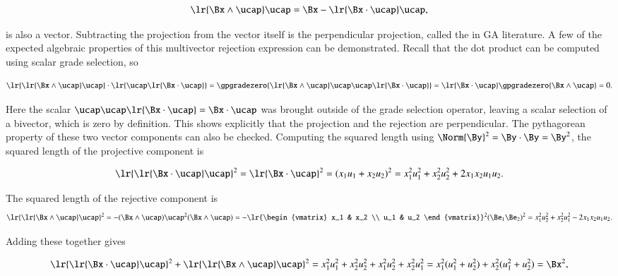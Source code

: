 \begin{dmath}\label{eqn:SimpleProducts2:700}
\lr{ \Bx \wedge \ucap } \ucap
=\Bx - \lr{ \Bx \cdot \ucap } \ucap,
\end{dmath}

is also a vector.
Subtracting the projection from the vector itself is the perpendicular projection, called the  in GA literature.
A few of the expected algebraic properties of this multivector rejection expression can be demonstrated.
Recall that the dot product can be computed using scalar grade selection, so

\begin{dmath}\label{eqn:SimpleProducts2:720}
\lr{ \lr{ \Bx \wedge \ucap } \ucap } \cdot \lr{ \ucap \lr{ \Bx \cdot \ucap } }
=
\gpgradezero{ \lr{ \Bx \wedge \ucap } \ucap \ucap \lr{ \Bx \cdot \ucap } }
=
\lr{ \Bx \cdot \ucap }
\gpgradezero{ \Bx \wedge \ucap }
= 0.
\end{dmath}

Here the scalar \( \ucap \ucap \lr{ \Bx \cdot \ucap } = \Bx \cdot \ucap \) was brought outside of the grade selection operator, leaving a scalar selection of a bivector, which is zero by definition.
This shows explicitly that the projection and the rejection are perpendicular.
The pythagorean property of these two vector components can also be checked.
Computing the squared length using \( \Norm{\By}^2 = \By \cdot \By = \By^2 \), the squared length of the projective component is

\begin{dmath}\label{eqn:SimpleProducts2:740}
\lr{ \lr{\Bx \cdot \ucap } \ucap }^2
=
\lr{\Bx \cdot \ucap }^2
=
(x_1 u_1 + x_2 u_2)^2
=
x_1^2 u_1^2 + x_2^2 u_2^2 + 2 x_1 x_2 u_1 u_2.
\end{dmath}

The squared length of the rejective component is
\begin{dmath}\label{eqn:SimpleProducts2:760}
\lr{ \lr{\Bx \wedge \ucap } \ucap }^2
=
-(\Bx \wedge \ucap) \ucap^2 (\Bx \wedge \ucap)
=
-
\lr{\begin{vmatrix}
   x_1 & x_2 \\
   u_1 & u_2
\end{vmatrix}}^2
(\Be_1 \Be_2)^2
=
x_1^2 u_2^2 + x_2^2 u_1^2 - 2 x_1 x_2 u_1 u_2.
\end{dmath}

Adding these together gives

\begin{dmath}\label{eqn:SimpleProducts2:780}
\lr{ \lr{\Bx \cdot \ucap } \ucap }^2 + \lr{ \lr{\Bx \wedge \ucap } \ucap }^2
=
x_1^2 u_1^2 + x_2^2 u_2^2
+x_1^2 u_2^2 + x_2^2 u_1^2
=
x_1^2 ( u_1^2 + u_2^2 )
+
x_2^2 ( u_1^2 + u_2^2 )
=
\Bx^2,
\end{dmath}

